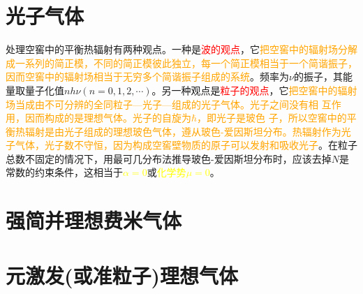 \documentclass[12pt,a4paper]{article}
\begin{document}
\section{光子气体}
处理空窖中的平衡热辐射有两种观点。一种是\textcolor{red}{波的观点}，它\textcolor{orange}{把空窖中的辐射场分解成一系列的简正模，不同的简正模彼此独立，每一个简正模相当于一个简谐振子，因而空窖中的辐射场相当于无穷多个简谐振子组成的系统}。频率为$\nu$的振子，其能量取量子化值$nh\nu(n=0, 1, 2, \cdots)$。另一种观点是\textcolor{red}{粒子的观点}，它\textcolor{orange}{把空窖中的辐射场当成由不可分辨的全同粒子—光子—组成的光子气体。光子之间没有相 互作用，因而构成的是理想气体。光子的自旋为$\hbar$，即光子是玻色 子，所以空窖中的平衡热辐射是由光子组成的理想玻色气体，遵从玻色-爱因斯坦分布。热辐射作为光子气体，光子数不守恒，因为构成空窖壁物质的原子可以发射和吸收光子}。在粒子总数不固定的情况下，用最可几分布法推导玻色-爱因斯坦分布时，应该去掉$N$是常数的约束条件，这相当于\textcolor{yellow}{$\alpha=0$}或\textcolor{yellow}{化学势$\mu=0$}。






















\section{强简并理想费米气体}





























\section{元激发(或准粒子)理想气体}
\end{document}
